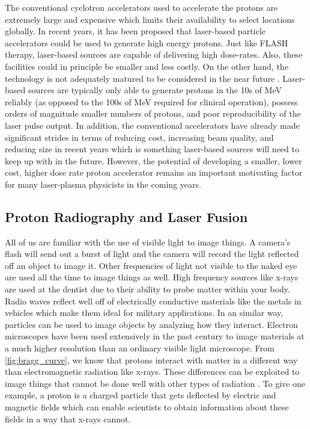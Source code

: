 The conventional cyclotron accelerators used to accelerate the protons are extremely large and expensive which limits their availability to select locations globally. In recent years, it has been proposed that laser-based particle accelerators could be used to generate high energy protons. Just like FLASH therapy, laser-based sources are capable of delivering high dose-rates. Also, these facilities could in principle be smaller and less costly. On the other hand, the technology is not adequately matured to be considered in the near future \cite{Linz_2016_LaPB}. Laser-based sources are typically only able to generate protons in the 10s of MeV reliably (as opposed to the 100s of MeV required for clinical operation), possess orders of magnitude smaller numbers of protons, and poor reproducibility of the laser pulse output. In addition, the conventional accelerators have already made significant strides in terms of reducing cost, increasing beam quality, and reducing size in recent years \cite{Linz_2016_LaPB} which is something laser-based sources will need to keep up with in the future. However, the potential of developing a smaller, lower cost, higher dose rate proton accelerator remains an important motivating factor for many laser-plasma physicists in the coming years.

\subsection{Proton Radiography and Laser Fusion}

All of us are familiar with the use of visible light to image things. A camera's flash will send out a burst of light and the camera will record the light reflected off an object to image it. Other frequencies of light not visible to the naked eye are used all the time to image things as well. High frequency sources like x-rays are used at the dentist due to their ability to probe matter within your body. Radio waves reflect well off of electrically conductive materials like the metals in vehicles which make them ideal for military applications. In an similar way, particles can be used to image objects by analyzing how they interact. Electron microscopes have been used extensively in the past century to image materials at a much higher resolution than an ordinary visible light microscope. From \autoref{fig:bragg_curve}, we know that protons interact with matter in a different way than electromagnetic radiation like x-rays. These differences can be exploited to image things that cannot be done well with other types of radiation \cite{Schaeffer_2023_RevMod}. To give one example, a proton is a charged particle that gets deflected by electric and magnetic fields which can enable scientists to obtain information about these fields in a way that x-rays cannot.

